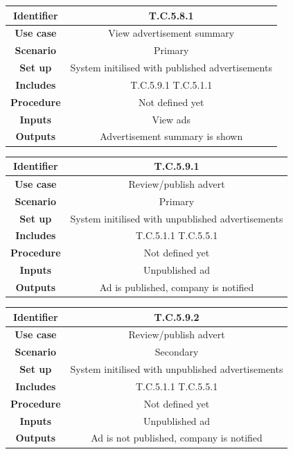 \documentclass{l3deliverable}
\begin{document}
\begin{tabular}{|c|c|}
\hline \textbf{Identifier} & T.C.5.8.1\\
\hline \textbf{Use case} & View advertisement summary\\
\hline \textbf{Scenario} & Primary\\
\hline \textbf{Set up} & System initilised with published advertisements\\
\hline \textbf{Includes} & T.C.5.9.1 T.C.5.1.1\\
\hline \textbf{Procedure} & Not defined yet\\
\hline \textbf{Inputs} & View ads\\
\hline \textbf{Outputs} & Advertisement summary is shown\\
\hline
\end{tabular}

\begin{tabular}{|c|c|}
\hline \textbf{Identifier} & T.C.5.9.1\\
\hline \textbf{Use case} & Review/publish advert\\
\hline \textbf{Scenario} & Primary\\
\hline \textbf{Set up} & System initilised with unpublished advertisements\\
\hline \textbf{Includes} & T.C.5.1.1 T.C.5.5.1\\
\hline \textbf{Procedure} & Not defined yet\\
\hline \textbf{Inputs} & Unpublished ad\\
\hline \textbf{Outputs} & Ad is published, company is notified\\
\hline
\end{tabular}

\begin{tabular}{|c|c|}
\hline \textbf{Identifier} & T.C.5.9.2\\
\hline \textbf{Use case} & Review/publish advert\\
\hline \textbf{Scenario} & Secondary\\
\hline \textbf{Set up} & System initilised with unpublished advertisements\\
\hline \textbf{Includes} & T.C.5.1.1 T.C.5.5.1\\
\hline \textbf{Procedure} & Not defined yet\\
\hline \textbf{Inputs} & Unpublished ad\\
\hline \textbf{Outputs} & Ad is not published, company is notified\\
\hline
\end{tabular}
\end{document}
